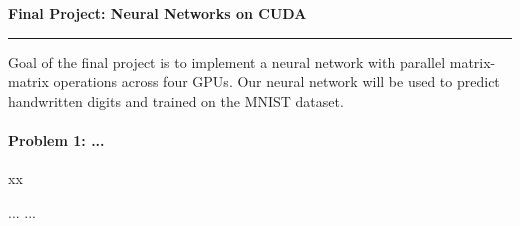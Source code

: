 \documentclass[12pt,letterpaper,twoside]{article}
\begin{document}
{\centering \textbf{Final Project: Neural Networks on CUDA\\}}
\vspace*{-8pt}\noindent\rule{\linewidth}{1pt}

Goal of the final project is to implement a neural network with parallel 
matrix-matrix operations across four GPUs. Our neural network will be used
to predict handwritten digits and trained on the MNIST dataset.

\paragraph{Problem 1: ... } xx

...
...
\end{document}
